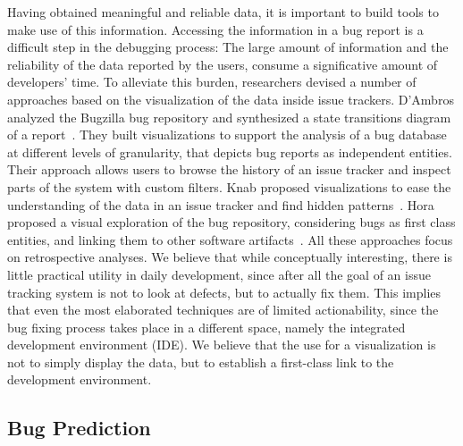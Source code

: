 Having obtained meaningful and reliable data, it is important to build tools to make use of this information. Accessing the information in a bug report is a difficult step in the debugging process: The large amount of information and the reliability of the data reported by the users, consume a significative amount of developers' time. To alleviate this burden, researchers devised a number of approaches based on the visualization of the data inside issue trackers. D'Ambros \etal analyzed the Bugzilla bug repository and synthesized a state transitions diagram of a report~\cite{DAmb2007b}. They built visualizations to support the analysis of a bug database at different levels of granularity, that depicts bug reports as independent entities. Their approach allows users to browse the history of an issue tracker and inspect parts of the system with custom filters. Knab \etal proposed visualizations to ease the understanding of the data in an issue tracker and find hidden patterns~\cite{Knab2009,Knab2010}. Hora \etal proposed a visual exploration of the bug repository, considering bugs as first class entities, and linking them to other software artifacts~\cite{Hora2012}. All these approaches focus on retrospective analyses. We believe that while conceptually interesting, there is little practical utility in daily development, since after all the goal of an issue tracking system is not to look at defects, but to actually fix them. This implies that even the most elaborated techniques are of limited actionability, since the bug fixing process takes place in a different space, namely the integrated development environment (IDE). We believe that the use for a visualization is not to simply display the data, but to establish a first-class link to the development environment.


\subsection{Bug Prediction}

